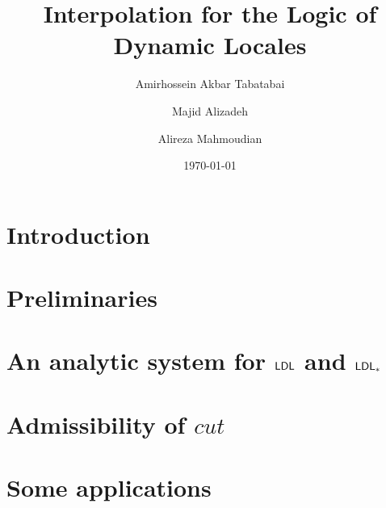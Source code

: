 \documentclass[10pt,a4paper]{amsart}
\begin{document}
\title{Interpolation for the Logic of Dynamic Locales}
\author{Amirhossein Akbar Tabatabai}


\author{Majid Alizadeh}

\author{Alireza Mahmoudian}

\date{\today}
 
\begin{abstract}
	
\end{abstract}

\maketitle



\section{Introduction}


\section{Preliminaries}


\section{An analytic system for $\mathsf{LDL}$ and $\mathsf{LDL}_*$}


\section{Admissibility of $cut$}


\section{Some applications}




\end{document}
